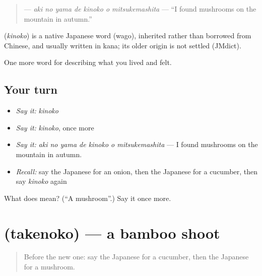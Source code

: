 \begin{quote}
\textbf{   } — \emph{aki no yama de kinoko o mitsukemashita} — \textquotedblleft{}I found mushrooms on the mountain in autumn.\textquotedblright{}
\end{quote}

\begin{cousinweb}
\textbf{} (\emph{kinoko}) is a native Japanese word (wago), inherited rather than borrowed from Chinese, and usually written in kana; its older origin is not settled (JMdict).
\end{cousinweb}

\begin{grammarlens}[title={What you've built}]
One more word for describing what you lived and felt.
\end{grammarlens}

\subsection*{Your turn}
\begin{itemize}
\raggedright
  \item \emph{Say it:} \emph{kinoko}
  \item \emph{Say it:} \emph{kinoko}, once more
  \item \emph{Say it:} \emph{aki no yama de kinoko o mitsukemashita} — I found mushrooms on the mountain in autumn.
  \item \emph{Recall:} say the Japanese for an onion, then the Japanese for a cucumber, then say \emph{kinoko} again
\end{itemize}

\begin{tcolorbox}[breakable,colback=teal!4,colframe=teal!35!black,title={Before you move on}]
What does  mean? (\textquotedblleft{}A mushroom\textquotedblright{}.) Say it once more.
\end{tcolorbox}
\section[\texorpdfstring{\ja{たけのこ} (takenoko)}{たけのこ (takenoko)}]{ (takenoko) — a bamboo shoot}

\label{lesson:JA-C494-takenoko}



\begin{quote}
Before the new one: say the Japanese for a cucumber, then the Japanese for a mushroom.
\end{quote}

